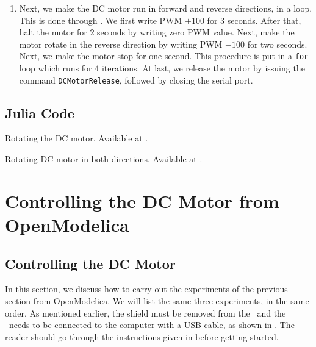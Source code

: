 \begin{enumerate}
  \item Next, we make the DC motor run in forward and reverse
        directions, in a loop.  This is done through
        .  We first write PWM $+100$ for 3
        seconds.  After that, halt the motor for 2 seconds by writing zero PWM value.  
        Next, make the motor rotate in the reverse direction by writing PWM $-100$ for two seconds.  
        Next, we make the motor stop for one second. This procedure is put in a {\tt for} loop which runs for 4 iterations.
        At last, we release the motor by issuing the command {\tt DCMotorRelease}, followed by closing the serial port. 
        
\end{enumerate}


\subsection{Julia Code}
\label{sec:dcmotor-julia-code}

\begin{juliacode}
  {Rotating the DC motor.  Available at
    .}
  \label{julia:dcmotor-clock}
  
\end{juliacode}

\begin{juliacode}
  {Rotating DC motor in both directions.  Available at
    .}
  \label{julia:dcmotor-both}
  
\end{juliacode}

\begin{juliacode}
  \label{julia:dcmotor-loop}
  
\end{juliacode}


\section{Controlling the DC Motor from OpenModelica}
\subsection{Controlling the DC Motor}
In this section, we discuss how to carry out the experiments of the
previous section from OpenModelica.  We will list the same three experiments,
in the same order.  As mentioned earlier, the shield must be removed from 
the \arduino\ and the \arduino\ needs to be connected to the computer 
with a USB cable, as shown in . The reader should go through the instructions given in
 before getting started.



